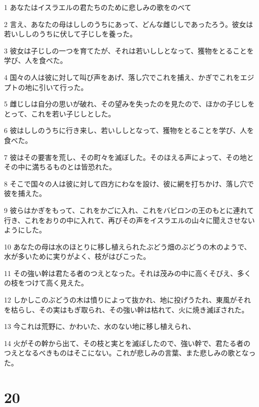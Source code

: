 \par 1 あなたはイスラエルの君たちのために悲しみの歌をのべて
\par 2 言え、あなたの母はししのうちにあって、どんな雌じしであったろう。彼女は若いししのうちに伏して子じしを養った。
\par 3 彼女は子じしの一つを育てたが、それは若いししとなって、獲物をとることを学び、人を食べた。
\par 4 国々の人は彼に対して叫び声をあげ、落し穴でこれを捕え、かぎでこれをエジプトの地に引いて行った。
\par 5 雌じしは自分の思いが破れ、その望みを失ったのを見たので、ほかの子じしをとって、これを若い子じしとした。
\par 6 彼はししのうちに行き来し、若いししとなって、獲物をとることを学び、人を食べた。
\par 7 彼はその要害を荒し、その町々を滅ぼした。そのほえる声によって、その地とその中に満ちるものとは皆恐れた。
\par 8 そこで国々の人は彼に対して四方にわなを設け、彼に網を打ちかけ、落し穴で彼を捕えた。
\par 9 彼らはかぎをもって、これをかごに入れ、これをバビロンの王のもとに連れて行き、これをおりの中に入れて、再びその声をイスラエルの山々に聞えさせないようにした。
\par 10 あなたの母は水のほとりに移し植えられたぶどう畑のぶどうの木のようで、水が多いために実りがよく、枝がはびこった。
\par 11 その強い幹は君たる者のつえとなった。それは茂みの中に高くそびえ、多くの枝をつけて高く見えた。
\par 12 しかしこのぶどうの木は憤りによって抜かれ、地に投げうたれ、東風がそれを枯らし、その実はもぎ取られ、その強い幹は枯れて、火に焼き滅ぼされた。
\par 13 今これは荒野に、かわいた、水のない地に移し植えられ、
\par 14 火がその幹から出て、その枝と実とを滅ぼしたので、強い幹で、君たる者のつえとなるべきものはそこにない。これが悲しみの言葉、また悲しみの歌となった。

\chapter{20}

